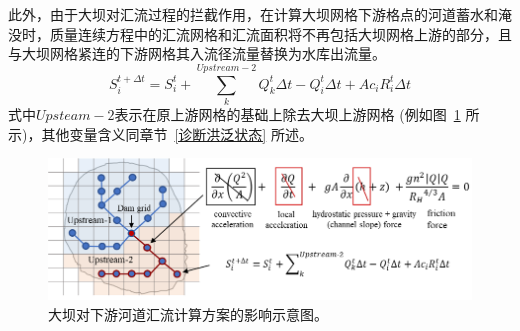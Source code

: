 此外，由于大坝对汇流过程的拦截作用，在计算大坝网格下游格点的河道蓄水和淹没时，质量连续方程中的汇流网格和汇流面积将不再包括大坝网格上游的部分，且与大坝网格紧连的下游网格其入流径流量替换为水库出流量。
\begin{equation}
S_{i}^{t+\Delta t}=S_{i}^{t}+\sum_{k}^{Upstream-2} Q_{k}^{t} \Delta t-Q_{i}^{t} \Delta t+A c_{i} R_{i}^{t} \Delta t
\end{equation}
式中$Upsteam-2$表示在原上游网格的基础上除去大坝上游网格 (例如图~\ref{fig:大坝对下游河道汇流计算方案的影响示意图} 所示)，其他变量含义同章节~\ref{诊断洪泛状态} 所述。

{
\begin{figure}[htbp]
\centering
\includegraphics{Figures/陆地表面的水分循环/大坝对下游河道汇流计算方案的影响示意图.png}
\caption{大坝对下游河道汇流计算方案的影响示意图。}
\label{fig:大坝对下游河道汇流计算方案的影响示意图}
\end{figure}
}
